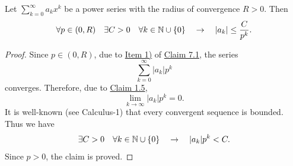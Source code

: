 \begin{claim}\label{claim:7.10}
Let $\sum_{k=0}^{\infty}a_kx^k$ be a power series with the radius of convergence $R>0$.
Then
\[
\forall p\in(0,R)\quad \exists C>0\quad \forall k\in\mathbb{N}\cup\{0\}
\quad\to\quad
|a_k|\leq\frac{C}{p^k}.
\]
\end{claim}

\begin{proof}
Since $p\in(0,R)$, due to \hyperref[item:claim:7.1:1]{Item 1)} of \hyperref[claim:7.1]{Claim 7.1}, the series
\[
\sum_{k=0}^{\infty}|a_k|p^k
\]
converges. Therefore, due to \hyperref[claim:1.5]{Claim 1.5},
\[
\lim_{k\to\infty}|a_k|p^k=0.
\]
It is well-known (see Calculus-1) that every convergent sequence is bounded. Thus we have
\[
\exists C>0\quad \forall k\in\mathbb{N}\cup\{0\}
\quad\to\quad
|a_k|p^k<C.
\]
Since $p>0$, the claim is proved.
\end{proof}
